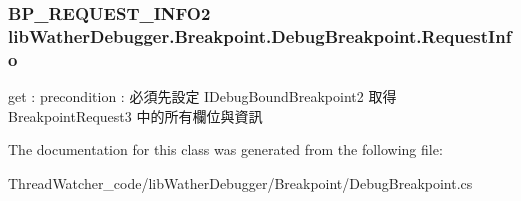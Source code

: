 \hypertarget{classlib_wather_debugger_1_1_breakpoint_1_1_debug_breakpoint_a6cfd191f546cfd50d85a61ab33ef899a}{
\subsubsection[{Request\+Info}]{\setlength{\rightskip}{0pt plus 5cm}B\+P\+\_\+\+R\+E\+Q\+U\+E\+S\+T\+\_\+\+I\+N\+F\+O2 lib\+Wather\+Debugger.\+Breakpoint.\+Debug\+Breakpoint.\+Request\+Info\hspace{0.3cm}{\ttfamily [get]}}}\label{classlib_wather_debugger_1_1_breakpoint_1_1_debug_breakpoint_a6cfd191f546cfd50d85a61ab33ef899a}


get \+: precondition \+: 必須先設定 I\+Debug\+Bound\+Breakpoint2 取得 Breakpoint\+Request3 中的所有欄位與資訊 



The documentation for this class was generated from the following file\+:\begin{DoxyCompactItemize}
\item 
Thread\+Watcher\+\_\+code/lib\+Wather\+Debugger/\+Breakpoint/Debug\+Breakpoint.\+cs\end{DoxyCompactItemize}
